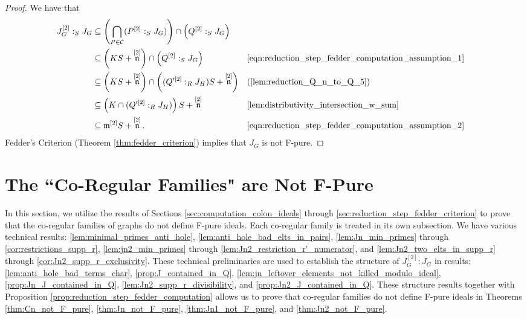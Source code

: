 \documentclass[12pt,a4paper]{amsart}
\theoremstyle{plain}
\theoremstyle{definition}
\def\bproof{\begin{proof}}
\def\eproof{\end{proof}}
\theoremstyle{remark}
\def\m{\mathfrak{m}}
\DeclareMathOperator{\n}{\mathfrak{n}}
\newcommand{\mc}[1]{\mathcal{ #1 }}
\renewcommand{\subset}{\subseteq}
\begin{document}
\bproof
We have that
\begin{align*}
    J_{G}^{[2]} :_{S} J_{G} 
    &\subset \left( \bigcap_{P \in \mc{C}} (P^{[2]} :_{S} J_{G}) \right) \cap \left( Q^{[2]} :_{S} J_{G} \right) & \\
    & \subset \left( KS + \n^{[2]} \right) \cap \left( Q^{[2]} :_{S} J_{G} \right) & & \eqref{eqn:reduction_step_fedder_computation_assumption_1} \\ 
    & \subset \left( KS + \n^{[2]} \right) \cap \left( (Q'^{[2]} :_{R} J_{H})S + \n^{[2]} \right) & & (\ref{lem:reduction_Q_n_to_Q_5}) \\
    &\subset \left( K \cap (Q'^{[2]} :_{R} J_{H}) \right)S + \n^{[2]} & & \eqref{lem:distributivity_intersection_w_sum} \\
    & \subset \m^{[2]}S + \n^{[2]}. & & \eqref{eqn:reduction_step_fedder_computation_assumption_2}
\end{align*}
Fedder's Criterion (Theorem \ref{thm:fedder_criterion}) implies that $J_{G}$ is not F-pure.
\eproof

\section{The ``Co-Regular Families" are Not F-Pure}
\label{sec:co_regular_not_f_pure}

In this section, we utilize the results of Sections \ref{sec:computation_colon_ideals} through \ref{sec:reduction_step_fedder_criterion} to prove that the co-regular families of graphs do not define F-pure ideals. Each co-regular family is treated in its own subsection. We have various technical results: \ref{lem:minimal_primes_anti_hole}, \ref{lem:anti_hole_bad_elts_in_pairs}, \ref{lem:Jn_min_primes} through \ref{cor:restrictions_supp_r}, \ref{lem:jn2_min_primes} through \ref{lem:Jn2_restriction_r'_numerator}, and \ref{lem:Jn2_two_elts_in_supp_r} through \ref{cor:Jn2_supp_r_exclusivity}. These technical preliminaries are used to establish the structure of $J_G^{[2]}:J_G$ in results: \ref{lem:anti_hole_bad_terms_char}, \ref{prop:J_contained_in_Q}, \ref{lem:jn_leftover_elements_not_killed_modulo_ideal}, \ref{prop:Jn_J_contained_in_Q}, \ref{lem:Jn2_supp_r_divisibility}, and \ref{prop:Jn2_J_contained_in_Q}. These structure results together with Proposition \ref{prop:reduction_step_fedder_computation} allows us to prove that co-regular families do not define F-pure ideals in Theorems \ref{thm:Cn_not_F_pure}, \ref{thm:Jn_not_F_pure}, \ref{thm:Jn1_not_F_pure}, and \ref{thm:Jn2_not_F_pure}.
\end{document}
